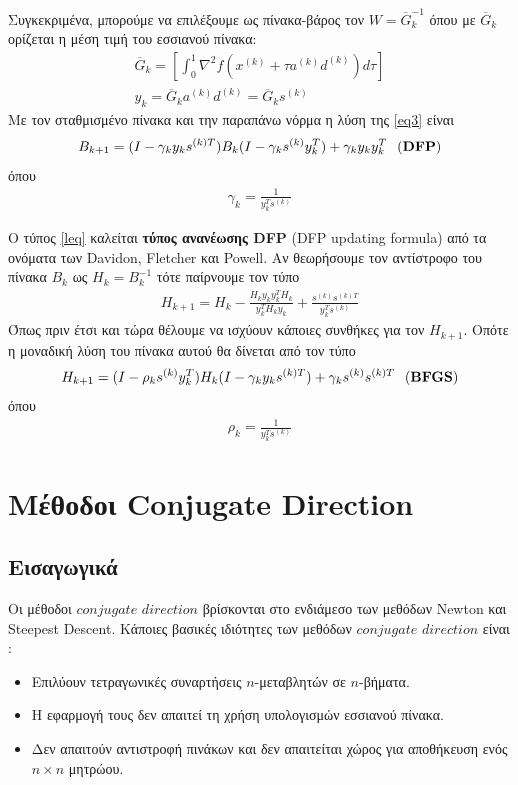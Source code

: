 \documentclass[a4paper,12pt,twoside]{report}
\theoremstyle{plain}
\theoremstyle{definition}
\theoremstyle{remark}
\begin{document}
Συγκεκριμένα, μπορούμε να επιλέξουμε ως πίνακα-βάρος τον $W = \overline{G}_k^{-1}$ όπου με $\overline{G}_k$ ορίζεται \cite{nocedal2006numerical} η μέση τιμή του εσσιανού πίνακα:
\begin{align}
\overline{G}_k = [\int_0^1 \nabla ^2f(x^{(k)} + \tau a^{(k)}d^{(k)}) d\tau]\\
y_k = \overline{G}_ka^{(k)}d^{(k)} = \overline{G}_ks^{(k)}
\end{align}
Με τον σταθμισμένο πίνακα και την παραπάνω νόρμα η λύση της \ref{eq3} είναι
\begin{align}\label{leq}
B_{k+1} = (I - \gamma_ky_ks^{(k)T})B_k(I - \gamma_ks^{(k)}y_k ^T) + \gamma_ky_ky_k ^T \hspace{0.25cm} (\textbf{DFP})
\end{align}
 όπου
 \begin{align}
 \gamma_k = \frac{1}{y_k ^Ts^{(k)}}
 \end{align}
 
 O τύπος \ref{leq} καλείται \textbf{τύπος ανανέωσης DFP} (DFP updating formula) από τα ονόματα των Davidon, Fletcher και Powell. Aν θεωρήσουμε τον αντίστροφο του πίνακα $B_k$ ως $H_k = B_k^{-1}$ τότε παίρνουμε τον τύπο 
\begin{align}
H_{k+1} = H_k - \frac{H_ky_ky_k ^TH_k}{y_k ^TH_ky_k} + \frac{s^{(k)}s^{(k)T}}{y_k^Ts^{(k)}} 
\end{align}
Όπως πριν έτσι και τώρα θέλουμε να ισχύουν κάποιες συνθήκες για τον $H_{k+1}$. Οπότε η μοναδική λύση του πίνακα αυτού θα δίνεται από τον τύπο
\begin{align}\label{eq4}
H_{k+1} = (I - \rho_ks^{(k)}y_k ^T)H_k(I -  \gamma_ky_ks^{(k)T}) + \gamma_ks^{(k)}s^{(k)T} \hspace{0.25cm} (\textbf{BFGS})
\end{align}
όπου
\begin{align}
\rho_k=\frac{1}{y_k^Ts^{(k)}}
\end{align}

        
\section{Μέθοδοι Conjugate Direction}
\subsection{Εισαγωγικά}

Οι μέθοδοι $conjugate$ $direction$  βρίσκονται στο ενδιάμεσο των μεθόδων Newton και Steepest Descent. Κάποιες βασικές ιδιότητες των μεθόδων $conjugate$ $direction$ είναι :
\begin{itemize}
\item Επιλύουν τετραγωνικές συναρτήσεις $n$-μεταβλητών σε $n$-βήματα.
\vspace{-0.2cm}
\item H εφαρμογή τους δεν απαιτεί τη χρήση υπολογισμών εσσιανού πίνακα.
\vspace{-0.2cm}
\item Δεν απαιτούν αντιστροφή πινάκων και δεν απαιτείται χώρος για αποθήκευση ενός $n\times n$ μητρώου.
\end{itemize}
\end{document}

